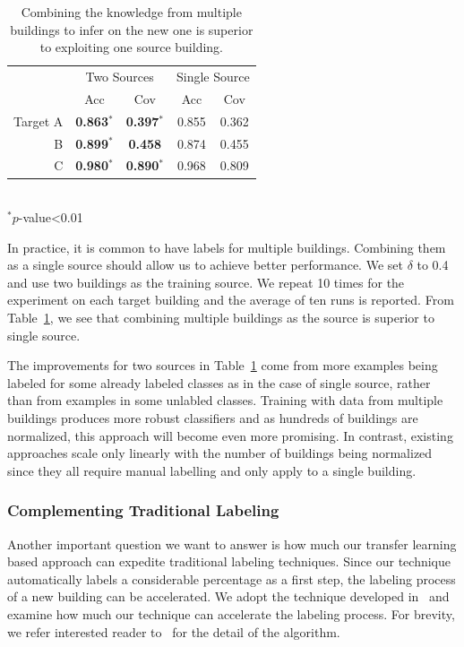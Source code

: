 \begin{table}[h]
\centering
\begin{tabular}{r|cc|cc}
\hline
\multirow{2}{*}{} & \multicolumn{2}{c|}{Two Sources} & \multicolumn{2}{c}{Single Source} \\ \cline{2-5} 
 & Acc & Cov & Acc & Cov \\ \hline
Target A & {\bf 0.863$^\ast$} & {\bf 0.397$^\ast$} & 0.855 & 0.362 \\ \hline
B & {\bf 0.899$^\ast$} & {\bf 0.458} & 0.874 & 0.455 \\ \hline
C & {\bf 0.980$^\ast$} & {\bf 0.890$^\ast$} & 0.968 & 0.809 \\ \hline
\end{tabular}
\\\noindent
$^\ast p$-value<0.01
\caption{Combining the knowledge from multiple buildings to infer on the new one is superior to exploiting one source building.}
\label{2source}
\end{table}

In practice, it is common to have labels for multiple buildings.  
Combining them as a single source should allow us to achieve better performance.
We set $\delta$ to 0.4 and use two buildings as the training source. %
We repeat 10 times for the experiment on each target building and the average of ten runs is reported.
From Table~\ref{2source}, we see that combining multiple buildings as the source is superior to single source.  %

The improvements for two sources in Table~\ref{2source} come from more examples being labeled for some already labeled classes as in the case of single source, rather than from examples in some unlabled classes. 
Training with data from multiple buildings produces more robust classifiers and as hundreds of buildings are normalized, this approach will become even more promising. 
In contrast, existing approaches scale only linearly with the number of buildings being normalized since they all require manual labelling and only apply to a single building.


\subsubsection{Complementing Traditional Labeling}
Another important question we want to answer is how much our transfer learning based approach can expedite traditional labeling techniques. 
Since our technique automatically labels a considerable percentage as a first step, the labeling process of a new building can be accelerated.
We adopt the technique developed in~\cite{cikm} and examine how much our technique can accelerate the labeling process.
For brevity, we refer interested reader to~\cite{cikm} for the detail of the algorithm.

